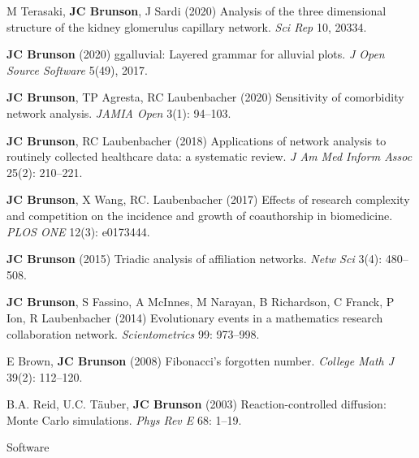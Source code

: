 \documentclass[10pt,a4paper]{article}
\begin{document}
\begin{enumerate}[label={[\arabic*]},labelindent=1cm,nolistsep]
\item
M Terasaki, {\bfseries JC Brunson}, J Sardi (2020) Analysis of the three dimensional structure of the kidney glomerulus capillary network. {\itshape Sci Rep} 10, 20334.
\item
{\bfseries JC Brunson} (2020) ggalluvial: Layered grammar for alluvial plots. {\itshape J Open Source Software} 5(49), 2017.
\item
{\bfseries JC Brunson}, TP Agresta, RC Laubenbacher (2020) Sensitivity of comorbidity network analysis. {\itshape JAMIA Open} 3(1): 94--103.
\item
{\bfseries JC Brunson}, RC Laubenbacher (2018) Applications of network analysis to routinely collected healthcare data: a systematic review. {\itshape J Am Med Inform Assoc} 25(2): 210--221.
\item
{\bfseries JC Brunson}, X Wang, RC. Laubenbacher (2017) Effects of research complexity and competition on the incidence and growth of coauthorship in biomedicine. {\itshape PLOS ONE} 12(3): e0173444.
\item
{\bfseries JC Brunson} (2015) Triadic analysis of affiliation networks. {\itshape Netw Sci} 3(4): 480--508.
\item
{\bfseries JC Brunson}, S Fassino, A McInnes, M Narayan, B Richardson, C Franck, P Ion, R Laubenbacher (2014) Evolutionary events in a mathematics research collaboration network. {\itshape Scientometrics} 99: 973--998.
\item
E Brown, {\bfseries JC Brunson} (2008) Fibonacci's forgotten number. {\itshape College Math J} 39(2): 112--120.
\item
B.A. Reid, U.C. T\"{a}uber, {\bfseries JC Brunson} (2003) Reaction-controlled diffusion: Monte Carlo simulations. {\itshape Phys Rev E} 68: 1--19.
\setcounter{paper}{\value{enumi}}
\end{enumerate}
%
\vspace{.25cm}
{\sc Software}
\end{document}
